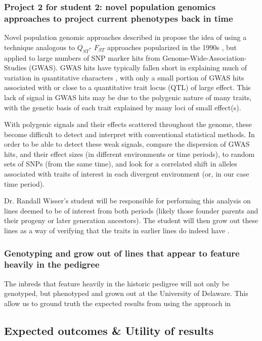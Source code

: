 \documentclass[12pt]{article}
\begin{document}
\subsubsection*{Project 2 for student 2: novel population genomics approaches to project current phenotypes back in time}
Novel population genomic approaches described in \cite{Berg:2014bs} propose the idea of using a technique analogous to $Q_{ST}$- $F_{ST}$ approaches popularized in the 1990s \citep{Latta:1998ek,  McKay:2002wi}, but applied to large numbers of SNP marker hits from Genome-Wide-Association-Studies (GWAS). 
GWAS hits have typically fallen short in explaining much of variation in quantitative characters \citep{Rockman:2011ej}, with only a small portion of GWAS hits associated with or close to a quantitative trait locus (QTL) of large effect. 
This lack of signal in GWAS hits may be due to the polygenic nature of many traits, with the genetic basis of each trait explained by many loci of small effect(s). 
\par With polygenic signals and their effects scattered throughout the genome, these become difficult to detect and interpret with conventional statistical methods. 
In order to be able to detect these weak signals, \cite{Berg:2014bs} compare the dispersion of GWAS hits, and their effect sizes (in different environments or time periods), to random sets of SNPs (from the same time), and look for a correlated shift in alleles associated with traits of interest in each divergent environment (or, in our case time period).
\par Dr. Randall Wisser's student will be responsible for performing this analysis on lines deemed to be of interest from both periods (likely those founder parents and their progeny or later generation ancestors). 
The student will then grow out these lines as a way of verifying that the traits in earlier lines do indeed have .


\subsubsection*{Genotyping and grow out of lines that appear to feature heavily in the pedigree}
The inbreds that feature heavily in the historic pedigree will not only be genotyped, but phenotyped and grown out at the University of Delaware. This allow us to ground truth the expected results from using the approach in \cite{Berg:2014bs}


\subsection*{Expected outcomes \& Utility of results}
\end{document}
